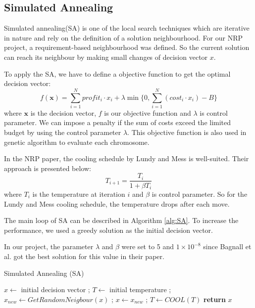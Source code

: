 \subsection{Simulated Annealing}
Simulated annealing(SA) is one of the local search techniques which are iterative in nature and rely on the definition of a solution neighbourhood. For our NRP project, a requirement-based neighbourhood was defined. So the current solution can reach its neighbour by making small changes of decision vector $x$.

To apply the SA, we have to define a objective function to get the optimal decision vector:
\[
f(\textbf{x}) = \sum_{i = 1}^{N} profit_i \cdot x_i + \lambda \min \Big\{0, \sum_{i = 1}^{N} (cost_i \cdot x_i) - B \Big\}
\]
where $\textbf{x}$ is the decision vector, $f$ is our objective function and $\lambda$ is control parameter. We can impose a penalty if the sum of costs exceed the limited budget by using the control parameter $\lambda$. This objective function is also used in genetic algorithm to evaluate each chromosome.

In the NRP paper\cite{NRP}, the cooling schedule by Lundy and Mess\cite{LundySA} is well-suited. Their approach is presented below:
\[
    T_{i+1} = \frac{T_i}{1 + \beta T_i}
\]
where $T_i$ is the temperature at iteration $i$ and $\beta$ is control parameter. So for the Lundy and Mess cooling schedule, the temperature drops after each move.

The main loop of SA can be described in Algorithm \ref{alg:SA}. To increase the performance, we used a greedy solution as the initial decision vector. 

In our project, the parameter $\lambda$ and $\beta$ were set to 5 and $1 \times 10^{-8}$ since Bagnall et al. got the best solution for this value in their paper.


\begin{algorithm}
\caption{Simulated Annealing (SA)}\label{alg:SA}
\begin{algorithmic}
    \State $x \gets$ initial decision vector ;
    \State $T \gets$ initial temperature ; 
        \State $x_{new} \gets GetRandomNeigbour(x)$ ;
            \State $x \gets x_{new}$ ;
        \EndIf
        \State $T \gets COOL(T)$ 
    \EndWhile
    \textbf{return} $x$
\end{algorithmic}
\end{algorithm}

